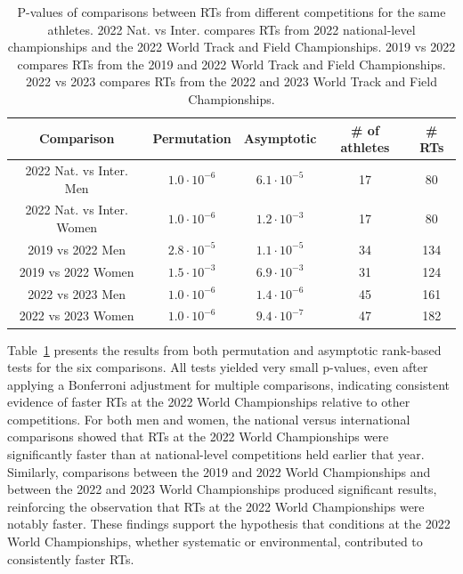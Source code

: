 \documentclass[12pt, letterpaper]{article}
\begin{document}
\begin{table}
  \centering
  \caption{P-values of comparisons between
    RTs from different competitions for the same athletes.
    2022 Nat. vs Inter. compares RTs from 2022 national-level
    championships and the 2022 World Track and Field Championships. 2019
    vs 2022 compares RTs from the 2019 and 2022 World Track and
    Field Championships. 2022 vs 2023 compares RTs from the
    2022 and 2023 World Track and Field Championships.}
  \begin{tabular}{c c c c c}
   \toprule
   Comparison & Permutation & Asymptotic & \# of athletes & \# RTs  \\
   \midrule
   2022 Nat. vs Inter. Men & $1.0 \cdot 10^{-6}$ & $ 6.1 \cdot 10^{-5}$ & 17 & 80 \\
   2022 Nat. vs Inter. Women & $1.0 \cdot 10^{-6}$ & $ 1.2 \cdot 10^{-3}$ & 17 & 80 \\[1ex]
   2019 vs 2022 Men & $2.8 \cdot 10^{-5}$ & $1.1 \cdot 10^{-5}$ & 34 & 134 \\
   2019 vs 2022 Women & $ 1.5 \cdot 10^{-3}$ & $6.9 \cdot 10^{-3}$ & 31 & 124 \\[1ex]
   2022 vs 2023 Men & $1.0 \cdot 10^{-6}$ & $1.4 \cdot 10^{-6}$ & 45 & 161 \\
   2022 vs 2023 Women & $1.0 \cdot 10^{-6}$ & $9.4 \cdot 10^{-7}$ & 47 & 182 \\
   \bottomrule
  \end{tabular}
  \label{tab:Clusrankresults}
\end{table}


Table~\ref{tab:Clusrankresults} presents the results from both permutation
and asymptotic rank-based tests for the six comparisons. All tests
yielded very small p-values, even after applying a Bonferroni
adjustment for multiple comparisons, indicating consistent evidence of
faster RTs at the 2022 World Championships relative to other
competitions. For both men and women, the national versus
international comparisons showed that RTs at the 2022 World
Championships were significantly faster than at national-level
competitions held earlier that year. Similarly, comparisons between
the 2019 and 2022 World Championships and between the 2022 and 2023
World Championships produced significant results, reinforcing the
observation that RTs at the 2022 World Championships were notably
faster. These findings support the hypothesis that conditions at the
2022 World Championships, whether systematic or
environmental, contributed to consistently faster RTs.
\end{document}

